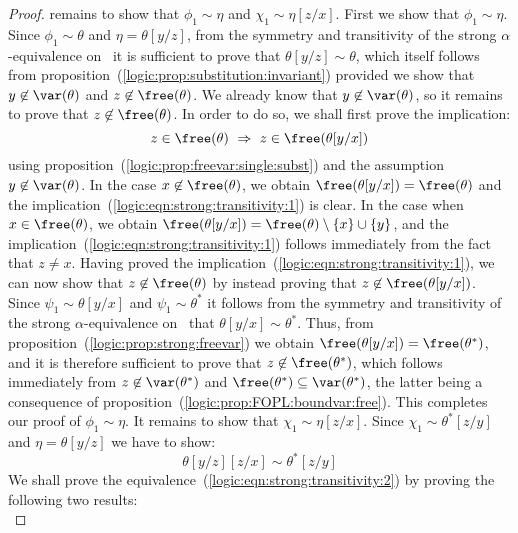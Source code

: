 \begin{proof}
remains to show that $\phi_{1}\sim\eta$ and $\chi_{1}\sim\eta[z/x]$.
First we show that $\phi_{1}\sim\eta$. Since $\phi_{1}\sim\theta$
and $\eta=\theta[y/z]$, from the symmetry and transitivity of the
strong $\alpha$-equivalence on \pv\, it is sufficient to prove
that $\theta[y/z]\sim\theta$, which itself follows from
proposition~(\ref{logic:prop:substitution:invariant}) provided we
show that $y\not\in\var(\theta)$ and $z\not\in\free(\theta)$. We
already know that $y\not\in\var(\theta)$, so it remains to prove
that $z\not\in\free(\theta)$. In order to do so, we shall first
prove the implication:
    \begin{equation}\label{logic:eqn:strong:transitivity:1}
    z\in\free(\theta)\ \Rightarrow\ z\in\free(\theta[y/x])
    \end{equation}
using proposition~(\ref{logic:prop:freevar:single:subst}) and the
assumption $y\not\in\var(\theta)$. In the case
$x\not\in\free(\theta)$, we obtain
$\free(\theta[y/x])=\free(\theta)$ and the
implication~(\ref{logic:eqn:strong:transitivity:1}) is clear. In the
case when $x\in\free(\theta)$, we obtain
$\free(\theta[y/x])=\free(\theta)\setminus\{x\}\cup\{y\}$, and the
implication~(\ref{logic:eqn:strong:transitivity:1}) follows
immediately from the fact that $z\neq x$. Having proved the
implication~(\ref{logic:eqn:strong:transitivity:1}), we can now show
that $z\not\in\free(\theta)$ by instead proving that
$z\not\in\free(\theta[y/x])$. Since $\psi_{1}\sim\theta[y/x]$ and
$\psi_{1}\sim\theta^{*}$ it follows from the symmetry and
transitivity of the strong $\alpha$-equivalence on \pv\ that
$\theta[y/x]\sim\theta^{*}$. Thus, from
proposition~(\ref{logic:prop:strong:freevar}) we obtain
$\free(\theta[y/x])=\free(\theta^{*})$, and it is therefore
sufficient to prove that $z\not\in\free(\theta^{*})$, which follows
immediately from $z\not\in\var(\theta^{*})$ and
$\free(\theta^{*})\subseteq\var(\theta^{*})$, the latter being a
consequence of proposition~(\ref{logic:prop:FOPL:boundvar:free}).
This completes our proof of $\phi_{1}\sim\eta$. It remains to show
that $\chi_{1}\sim\eta[z/x]$. Since $\chi_{1}\sim\theta^{*}[z/y]$
and $\eta=\theta[y/z]$ we have to show:
    \begin{equation}\label{logic:eqn:strong:transitivity:2}
    \theta[y/z][z/x]\sim\theta^{*}[z/y]
    \end{equation}
We shall prove the
equivalence~(\ref{logic:eqn:strong:transitivity:2}) by proving the
following two results:
    \begin{equation}\label{logic:eqn:strong:transitivity:3}

\end{equation}
\end{proof}

